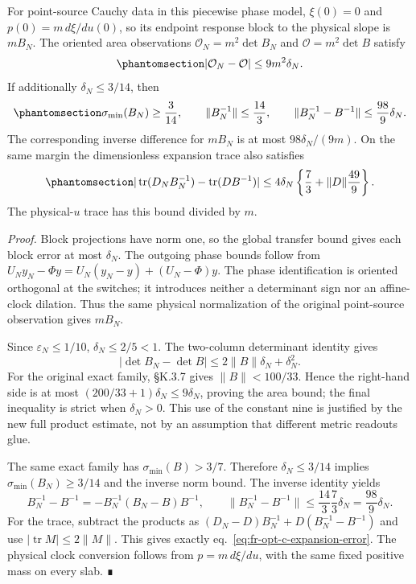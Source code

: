\documentclass[
  english,
  11pt,
  reqno]{amsart}
\begin{document}
For point-source Cauchy data in this piecewise phase model, \(\xi(0)=0\)
and \(p(0)=m\,d\xi/du(0)\), so its endpoint response block to the
physical slope is \(mB_N\). The oriented area observations
\(\mathcal O_N=m^2\det B_N\) and \(\mathcal O=m^2\det B\) satisfy
\begin{equation}\protect\phantomsection\label{eq:fr-opt-c-area-error}{
 |\mathcal O_N-\mathcal O|\le9m^2\delta_N.
}\end{equation} If additionally \(\delta_N\le3/14\), then
\begin{equation}\protect\phantomsection\label{eq:fr-opt-c-inverse-error}{
 \sigma_{\min}(B_N)\ge\frac3{14},\qquad
 \|B_N^{-1}\|\le\frac{14}{3},\qquad
 \|B_N^{-1}-B^{-1}\|\le\frac{98}{9}\delta_N.
}\end{equation} The corresponding inverse difference for \(mB_N\) is at
most \(98\delta_N/(9m)\). On the same margin the dimensionless expansion
trace also satisfies
\begin{equation}\protect\phantomsection\label{eq:fr-opt-c-expansion-error}{
 |\operatorname{tr}(D_NB_N^{-1})-
                  \operatorname{tr}(DB^{-1})|
 \le4\delta_N\left\{\frac73+\|D\|\frac{49}{9}\right\}.
}\end{equation} The physical-\(u\) trace has this bound divided by
\(m\).

\emph{Proof.} Block projections have norm one, so the global transfer
bound gives each block error at most \(\delta_N\). The outgoing phase
bounds follow from \(U_Ny_N-\Phi y=U_N(y_N-y)+(U_N-\Phi)y\). The phase
identification is oriented orthogonal at the switches; it introduces
neither a determinant sign nor an affine-clock dilation. Thus the same
physical normalization of the original point-source observation gives
\(mB_N\).

Since \(\varepsilon_N\le1/10\), \(\delta_N\le2/5<1\). The two-column
determinant identity gives \[
 |\det B_N-\det B|
 \le2\|B\|\delta_N+\delta_N^2.
\] For the original exact family, §K.3.7 gives \(\|B\|<100/33\). Hence
the right-hand side is at most \((200/33+1)\delta_N\le9\delta_N\),
proving the area bound; the final inequality is strict when
\(\delta_N>0\). This use of the constant nine is justified by the new
full product estimate, not by an assumption that different metric
readouts glue.

The same exact family has \(\sigma_{\min}(B)>3/7\). Therefore
\(\delta_N\le3/14\) implies \(\sigma_{\min}(B_N)\ge3/14\) and the
inverse norm bound. The inverse identity yields \[
 B_N^{-1}-B^{-1}=-B_N^{-1}(B_N-B)B^{-1},\qquad
 \|B_N^{-1}-B^{-1}\|
 \le\frac{14}{3}\frac73\delta_N=\frac{98}{9}\delta_N.
\] For the trace, subtract the products as
\((D_N-D)B_N^{-1}+D(B_N^{-1}-B^{-1})\) and use
\(|\operatorname{tr}M|\le2\|M\|\). This gives exactly
eq.~\ref{eq:fr-opt-c-expansion-error}. The physical clock conversion
follows from \(p=m\,d\xi/du\), with the same fixed positive mass on
every slab. ∎
\end{document}
